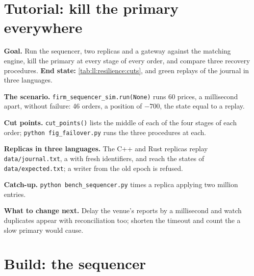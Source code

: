 \section{Tutorial: kill the primary everywhere}\label{tut:ll:resilience:tut}

\begin{tutorial}
\textbf{Goal.} Run the sequencer, two replicas and a gateway against the matching engine, kill the primary at every stage of
every order, and compare three recovery procedures. \textbf{End state:} \cref{tab:ll:resilience:cuts}, and green replays of
the  journal in three languages.
\begin{tutsteps}
\item \textbf{The scenario.} \texttt{firm\_sequencer\_sim.run(None)} runs 60 prices, a millisecond apart, without failure: 46
orders, a position of $-700$, the state equal to a replay.
\item \textbf{Cut points.} \texttt{cut\_points()} lists the middle of each of the four stages of each order; \texttt{python
fig\_failover.py} runs the three procedures at each.
\item \textbf{Replicas in three languages.} The C++ and Rust replicas replay \texttt{data/journal.txt}, a  with fresh
identifiers, and reach the states of \texttt{data/expected.txt}; a writer from the old epoch is refused.
\item \textbf{Catch-up.} \texttt{python bench\_sequencer.py} times a replica applying two million entries.
\end{tutsteps}
\textbf{What to change next.} Delay the venue's reports by a millisecond and watch duplicates appear with reconciliation too;
shorten the  timeout and count the  a slow primary would cause.
\end{tutorial}

\section{Build: the sequencer}\label{bld:ll:resilience:sequencer}

